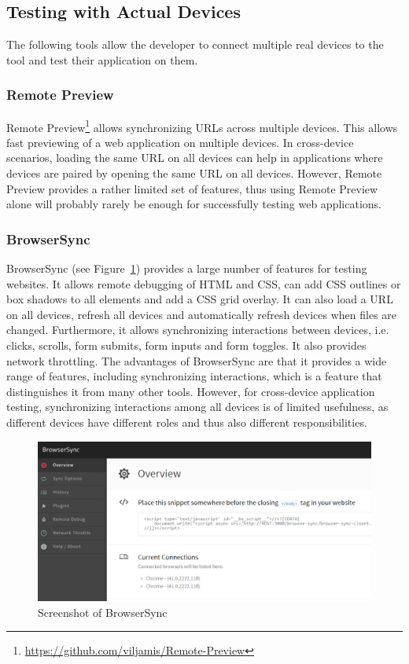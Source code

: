 \subsection{Testing with Actual Devices}

The following tools allow the developer to connect multiple real devices to the tool and test their application on them.

\subsubsection{Remote Preview}

Remote Preview\footnote{\url{https://github.com/viljamis/Remote-Preview}} allows synchronizing URLs across multiple devices. This allows fast previewing of a web application on multiple devices. In cross-device scenarios, loading the same URL on all devices can help in applications where devices are paired by opening the same URL on all devices. However, Remote Preview provides a rather limited set of features, thus using Remote Preview alone will probably rarely be enough for successfully testing web applications.

\subsubsection{BrowserSync}

BrowserSync (see Figure~\ref{fig:browsersync}) provides a large number of features for testing websites. It allows remote debugging of HTML and CSS, can add CSS outlines or box shadows to all elements and add a CSS grid overlay. It can also load a URL on all devices, refresh all devices and automatically refresh devices when files are changed. Furthermore, it allows synchronizing interactions between devices, i.e. clicks, scrolls, form submits, form inputs and form toggles. It also provides network throttling. The advantages of BrowserSync are that it provides a wide range of features, including synchronizing interactions, which is a feature that distinguishes it from many other tools. However, for cross-device application testing, synchronizing interactions among all devices is of limited usefulness, as different devices have different roles and thus also different responsibilities.

\begin{figure}[H]
  \centering
    \includegraphics[width=1.0\textwidth]{images/relatedwork/browser_sync_4.png}
	\caption[Screenshot: BrowserSync]{Screenshot of BrowserSync}
	\label{fig:browsersync}
\end{figure}

